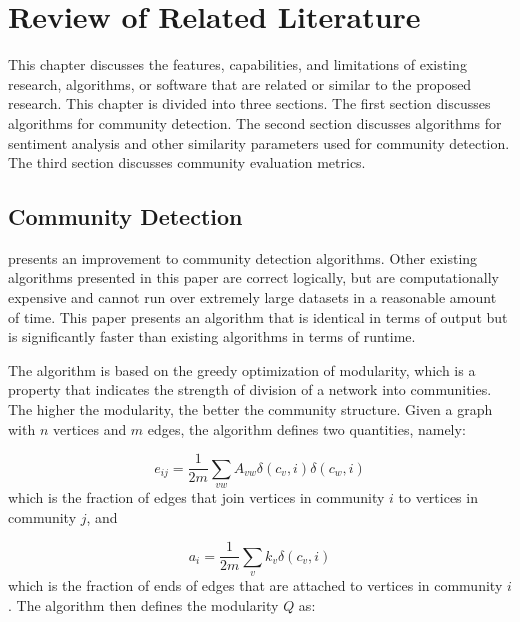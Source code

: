 %
%
%                 

\chapter{Review of Related Literature}
\label{sec:relatedlit}

This chapter discusses the features, capabilities, and limitations of existing research, algorithms, or software that are related or similar to the proposed research. This chapter is divided into three sections. The first section discusses algorithms for community detection. The second section discusses algorithms for sentiment analysis and other similarity parameters used for community detection. The third section discusses community evaluation metrics.

\section{Community Detection}

 presents an improvement to community detection algorithms. Other existing algorithms presented in this paper are correct logically, but are computationally expensive and cannot run over extremely large datasets in a reasonable amount of time. This paper presents an algorithm that is identical in terms of output but is significantly faster than existing algorithms in terms of runtime.

The algorithm is based on the greedy optimization of modularity, which is a property that indicates the strength of division of a network into communities. The higher the modularity, the better the community structure. Given a graph with $n$ vertices and $m$ edges, the algorithm defines two quantities, namely:

\begin{equation}
e_{ij} = \frac{1}{2m} \sum_{vw}{A_{vw}\delta(c_v,i)\delta(c_w,i)}
\end{equation}which is the fraction of edges that join vertices in community $i$ to vertices in community $j$, and

\begin{equation}
a_i = \frac{1}{2m} \sum_{v}{k_v\delta(c_v,i)}
\end{equation}which is the fraction of ends of edges that are attached to vertices in community $i$. The algorithm then defines the modularity $Q$ as:

